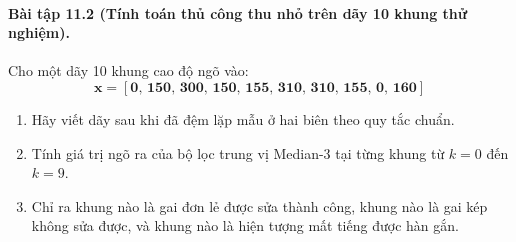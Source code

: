 \paragraph{Bài tập 11.2 (Tính toán thủ công thu nhỏ trên dãy 10 khung thử nghiệm).}
Cho một dãy 10 khung cao độ ngõ vào:
\begin{equation*}
    \mathbf{x = [0,\, 150,\, 300,\, 150,\, 155,\, 310,\, 310,\, 155,\, 0,\, 160]}
\end{equation*}
\begin{enumerate}[label=(\alph*)]
    \item Hãy viết dãy sau khi đã đệm lặp mẫu ở hai biên theo quy tắc chuẩn.
    \item Tính giá trị ngõ ra của bộ lọc trung vị Median-3 tại từng khung từ $k = 0$ đến $k = 9$.
    \item Chỉ ra khung nào là gai đơn lẻ được sửa thành công, khung nào là gai kép không sửa được, và khung nào là hiện tượng mất tiếng được hàn gắn.
\end{enumerate}

